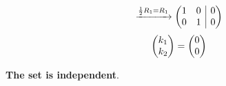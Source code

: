 \documentclass{article}
\begin{document}
{{\[\xrightarrow[]{\frac{1}{2}R_1 = R_1}
\left(\begin{array}{@{}cc|c@{}}
	1 &  0 & 0\\
	0 &  1 & 0 \\
\end{array}\right)
\]
\[
\left(\begin{array}{@{}c@{}}
	k_1 \\
	k_2 \\
\end{array}\right) = 
\left(\begin{array}{@{}c@{}}
	0 \\
	0 \\
\end{array}\right)
\]
\par\noindent \textbf{The set is independent}.
}
}
\newline
\newline
\newline
\end{document}
